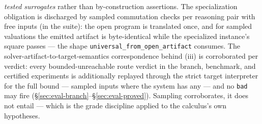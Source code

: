 \emph{tested surrogates} rather than by-construction assertions. The
specialization obligation is discharged by sampled commutation checks
per reasoning pair with free inputs (in the suite): the open program is
translated once, and for sampled valuations the emitted artifact is
byte-identical while the specialized instance's square passes --- the
shape \texttt{universal\_from\_open\_artifact} consumes. The
solver-artifact-to-target-semantics correspondence behind (iii) is
corroborated per verdict: every bounded-unreachable route verdict in
the branch, benchmark, and certified experiments is additionally
replayed through the strict
target interpreter for the full bound --- sampled inputs where the
system has any --- and no \texttt{bad} may fire
(\S\ref{sec:eval-branch}--\S\ref{sec:eval-proved}). Sampling
corroborates, it does not entail --- which is the grade discipline
applied to the calculus's own hypotheses.

